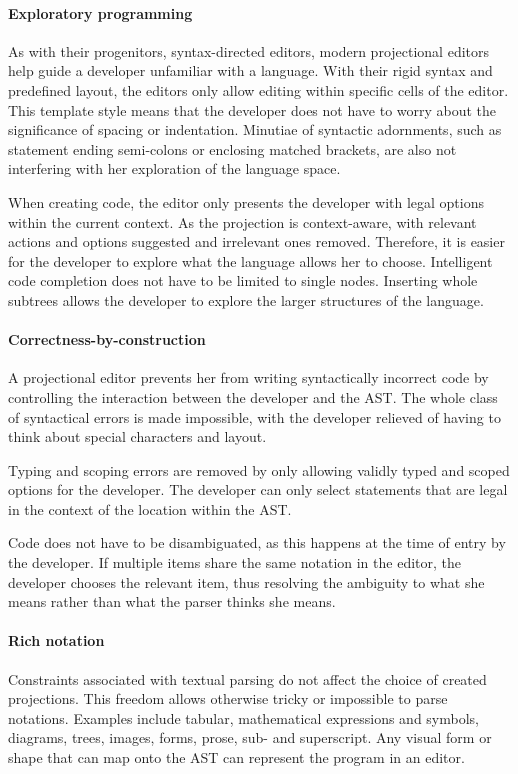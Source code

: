  
\paragraph{Exploratory programming} As with their progenitors, syntax-directed editors, modern projectional editors help guide a developer unfamiliar with a language.
With their rigid syntax and predefined layout, the editors only allow editing within specific cells of the editor.
This template style means that the developer does not have to worry about the significance of spacing or indentation.
Minutiae of syntactic adornments, such as statement ending semi-colons or enclosing matched brackets, are also not interfering with her exploration of the language space.

When creating code, the editor only presents the developer with legal options within the current context.
As the projection is context-aware, with relevant actions and options suggested and irrelevant ones removed.
Therefore, it is easier for the developer to explore what the language allows her to choose.
Intelligent code completion does not have to be limited to single nodes.
Inserting whole subtrees allows the developer to explore the larger structures of the language.

\paragraph{Correctness-by-construction} A projectional editor prevents her from writing syntactically incorrect code by controlling the interaction between the developer and the AST.
The whole class of syntactical errors is made impossible, with the developer relieved of having to think about special characters and layout.

Typing and scoping errors are removed by only allowing validly typed and scoped options for the developer.
The developer can only select statements that are legal in the context of the location within the AST.

Code does not have to be disambiguated, as this happens at the time of entry by the developer.
If multiple items share the same notation in the editor, the developer chooses the relevant item, thus resolving the ambiguity to what she means rather than what the parser thinks she means.

\paragraph{Rich notation} Constraints associated with textual parsing do not affect the choice of created projections. 
This freedom allows otherwise tricky or impossible to parse notations.
Examples include tabular, mathematical expressions and symbols, diagrams, trees, images, forms, prose, sub- and superscript.
Any visual form or shape that can map onto the AST can represent the program in an editor.

